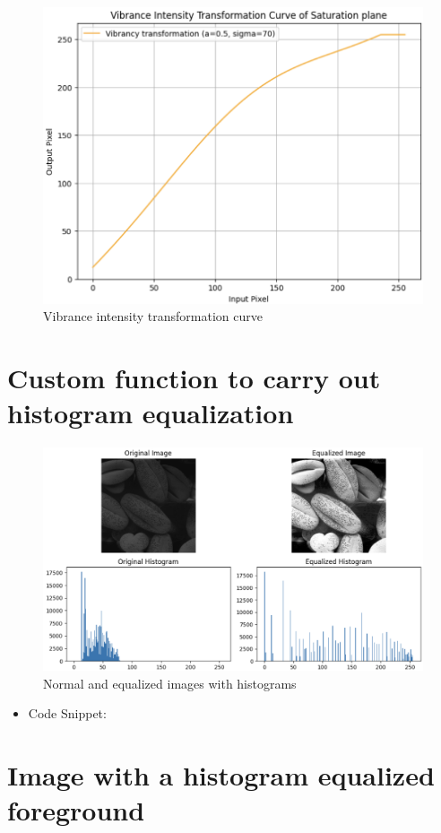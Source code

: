 \documentclass[12pt,a4paper]{article}
\begin{document}
\begin{enumerate}
    \begin{figure}[H]
        \centering
        \includegraphics[width=0.3\linewidth]{images/Screenshots/4e2.png}
        \caption{Vibrance intensity transformation curve}
        \label{fig:enter-label}
    \end{figure}
    

    
    
    \end{enumerate}

\section{Custom function to carry out histogram equalization}

    \begin{figure}[H]
        \centering
        \includegraphics[width=0.6\linewidth]{images/Screenshots/5.png}
        \caption{Normal and equalized images with histograms}
        \label{fig:enter-label}
    \end{figure}

    \begin{itemize}
        \item Code Snippet:
    \end{itemize}

    

\section{Image with a histogram equalized foreground}
\end{document}

